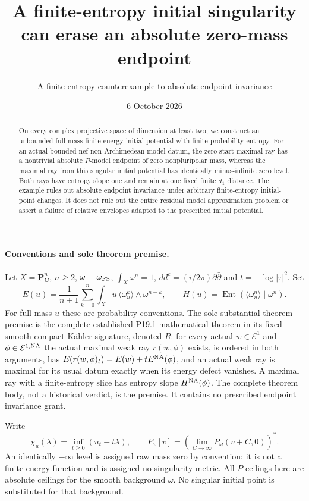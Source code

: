 \documentclass[10pt]{article}
\title{A finite-entropy initial singularity can erase an absolute zero-mass endpoint}
\author{A finite-entropy counterexample to absolute endpoint invariance}
\date{6 October 2026}
\newcommand{\ddc}{dd^c}
\newcommand{\PP}{\mathbf P}
\begin{document}
\maketitle
\begin{abstract}
On every complex projective space of dimension at least two, we construct
an unbounded full-mass finite-energy initial potential with finite
probability entropy. For an actual bounded nef non-Archimedean model datum,
the zero-start maximal ray has a nontrivial absolute $P$-model endpoint
of zero nonpluripolar mass, whereas the maximal ray from this singular
initial potential has identically minus-infinite zero level. Both rays
have entropy slope one and remain at one fixed finite $d_1$ distance.
The example rules out absolute endpoint invariance under arbitrary
finite-entropy initial-point changes. It does not rule out the entire
residual model approximation problem or assert a failure of relative
envelopes adapted to the prescribed initial potential.
\end{abstract}

\paragraph{Conventions and sole theorem premise.}
Let $X=\PP^n_{\mathbf C}$, $n\geq2$, $\omega=\omega_{\rm FS}$,
$\int_X\omega^n=1$, $\ddc=(i/2\pi)\partial\bar\partial$ and
$t=-\log|\tau|^2$. Set
\[
 E(u)=\frac1{n+1}\sum_{k=0}^n\int_Xu\,
        \langle\omega_u^k\rangle\wedge\omega^{n-k},\qquad
 H(u)=\operatorname{Ent}(\langle\omega_u^n\rangle\mid\omega^n).
\]
For full-mass $u$ these are probability conventions. The sole substantial
theorem premise is the complete established P19.1 mathematical theorem
in its fixed smooth compact K\"ahler signature, denoted $R$: for every
actual $w\in\mathcal E^1$ and $\phi\in\mathcal E^{1,\rm NA}$ the
actual maximal weak ray $r(w,\phi)$ exists, is ordered in both arguments,
has $E(r(w,\phi)_t)=E(w)+tE^{\rm NA}(\phi)$, and an actual weak ray
is maximal for its usual datum exactly when its energy defect vanishes.
A maximal ray with a finite-entropy slice has entropy slope
$H^{\rm NA}(\phi)$. The complete theorem body, not a historical verdict,
is the premise. It contains no prescribed endpoint invariance grant.

Write
\[
 \chi_u(\lambda)=\inf_{t\geq0}(u_t-t\lambda),\qquad
 P_\omega[v]=\left(\lim_{C\to\infty}P_\omega(v+C,0)\right)^*.
\]
An identically $-\infty$ level is assigned raw mass zero by convention;
it is not a finite-energy function and is assigned no singularity metric.
All $P$ ceilings here are absolute ceilings for the smooth background
$\omega$. No singular initial point is substituted for that background.
\end{document}
